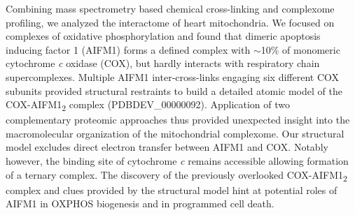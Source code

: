 \begin{abstract102}
    Combining mass spectrometry based chemical cross-linking and complexome profiling, we analyzed the interactome of heart mitochondria. We focused on complexes of oxidative phosphorylation and found that dimeric apoptosis inducing factor 1 (AIFM1) forms a defined complex with $\sim$10\% of monomeric cytochrome \emph{c} oxidase (COX), but hardly interacts with respiratory chain supercomplexes. Multiple AIFM1 inter-cross-links engaging six different COX subunits provided structural restraints to build a detailed atomic model of the COX-AIFM1\textsubscript{2} complex (PDBDEV\_00000092). Application of two complementary proteomic approaches thus provided unexpected insight into the macromolecular organization of the mitochondrial complexome. Our structural model excludes direct electron transfer between AIFM1 and COX. Notably however, the binding site of cytochrome \emph{c} remains accessible allowing formation of a ternary complex. The discovery of the previously overlooked COX-AIFM1\textsubscript{2} complex and clues provided by the structural model hint at potential roles of AIFM1 in OXPHOS biogenesis and in programmed cell death.
\end{abstract102}
\thumbforchapter
